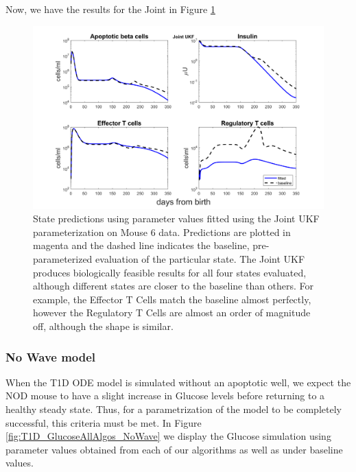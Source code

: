 

Now, we have the results for the Joint in Figure \ref{fig:joint_biocheck}

\begin{figure}[H] 
    \centering
    \includegraphics[width=15cm]{Kalman_Filter_Images/joint_mouse6_subsetofstates.png}
    \caption{State predictions using parameter values fitted using the Joint UKF parameterization on Mouse 6 data. Predictions are plotted in magenta and the dashed line indicates the baseline, pre-parameterized evaluation of the particular state. The Joint UKF produces biologically feasible results for all four states evaluated, although different states are closer to the baseline than others. For example, the Effector T Cells match the baseline almost perfectly, however the Regulatory T Cells are almost an order of magnitude off, although the shape is similar.}
    \label{fig:joint_biocheck}
\end{figure}


\subsubsection{No Wave model} \label{NoWaveModels}
When the T1D ODE model is simulated without an apoptotic well, we expect the NOD mouse to have a slight increase in Glucose levels before returning to a healthy steady state. Thus, for a parametrization of the model to be completely successful, this criteria must be met. In Figure \ref{fig:T1D_GlucoseAllAlgos_NoWave} we display the Glucose simulation using parameter values obtained from each of our algorithms as well as under baseline values.

